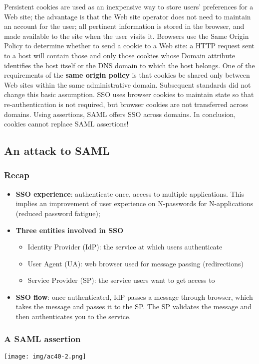 \documentclass[a4paper, 10pt, titlepage]{article}
\begin{document}
Persistent cookies are used as an inexpensive way to store users’ preferences for a Web site; the advantage is that the Web site operator does not need to maintain an account for the user; all pertinent information is stored in the browser, and made available to the site when the user visits it. Browsers use the Same Origin Policy to determine whether to send a cookie to a Web site: a HTTP request sent to a host will contain those and only those cookies whose Domain attribute identifies the host itself or the DNS domain to which the host belongs. One of the requirements of the \textbf{same origin policy} is that cookies be shared only between Web sites within the same administrative domain. Subsequent standards did not change this basic assumption. SSO uses browser cookies to maintain state so that re-authentication is not required, but browser cookies are not transferred across domains. Using assertions, SAML offers SSO across domains. In conclusion, cookies cannot replace SAML assertions!

\subsection{An attack to SAML}
\subsubsection*{Recap}
\begin{itemize}
\item \textbf{SSO experience}: authenticate once, access to multiple applications. This implies an improvement of user experience on N-passwords for N-applications (reduced password fatigue);
\item \textbf{Three entities involved in SSO}
	\begin{itemize}
	\item Identity Provider (IdP): the service at which users authenticate
	\item User Agent (UA): web browser used for message passing (redirections)
	\item Service Provider (SP): the service users want to get access to
	\end{itemize}
\item \textbf{SSO flow}: once authenticated, IdP passes a message through browser, which takes the message and passes it to the SP. The SP validates the message and then authenticates you to the service.
\end{itemize}

\subsubsection*{A SAML assertion}
\texttt{[image: img/ac40-2.png]}
\end{document}
